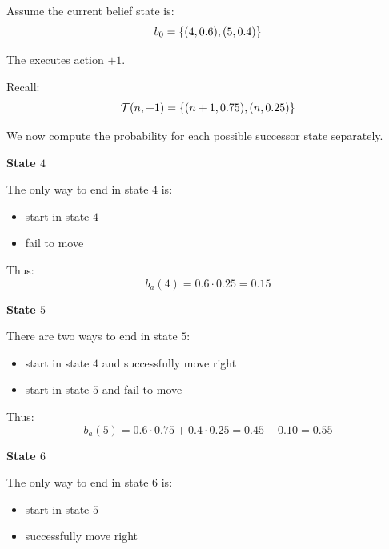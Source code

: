 


Assume the current belief state is:
\[
b_0=\left\{(4,0.6),(5,0.4)\right\}
\]

The  executes action $+1$.

Recall:
\[
\mathcal{T}(n,+1)
=
\left\{
(n+1,0.75),
(n,0.25)
\right\}
\]

We now compute the probability for each possible successor state separately.


\textbf{State $4$}

The only way to end in state $4$ is:
\begin{itemize}
    \item start in state $4$
    \item fail to move
\end{itemize}

Thus:
\[
b_a(4)
=
0.6\cdot 0.25
=
0.15
\]

\textbf{State $5$}

There are two ways to end in state $5$:
\begin{itemize}
    \item start in state $4$ and successfully move right
    \item start in state $5$ and fail to move
\end{itemize}

Thus:
\[
b_a(5)
=
0.6\cdot 0.75
+
0.4\cdot 0.25
=
0.45+0.10
=
0.55
\]

\textbf{State $6$}

The only way to end in state $6$ is:
\begin{itemize}
    \item start in state $5$
    \item successfully move right
\end{itemize}

